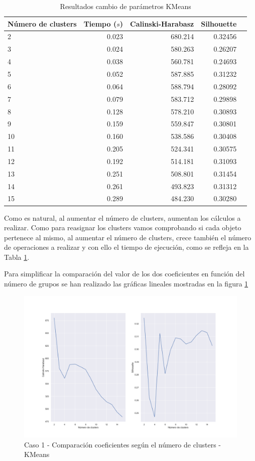 \documentclass[a4paper, 20pt]{article}
\begin{document}
\begin{table}[H]
\centering
\caption{Resultados cambio de parámetros KMeans}
\label{tab:param_kmeans1}
\begin{tabular}{lrrrr}
\toprule
Número de clusters & Tiempo ($s$) & Calinski-Harabasz & Silhouette &\\
\midrule
2 & 0.023 & 680.214 & 0.32456 \\
3 & 0.024 & 580.263 & 0.26207 \\
4 & 0.038 & 560.781 & 0.24693 \\
5 & 0.052 & 587.885 & 0.31232 \\
6 & 0.064 & 588.794 & 0.28092 \\
7 & 0.079 & 583.712 & 0.29898 \\
8 & 0.128 & 578.210 & 0.30893 \\
9 & 0.159 & 559.847 & 0.30801 \\
10 & 0.160 & 538.586 & 0.30408 \\
11 & 0.205 & 524.341 & 0.30575 \\
12 & 0.192 & 514.181 & 0.31093 \\
13 & 0.251 & 508.801 & 0.31454 \\
14 & 0.261 & 493.823 & 0.31312 \\
15 & 0.289 & 484.230 & 0.30280 \\
\bottomrule
\end{tabular}
\end{table}

Como es natural, al aumentar el número de clusters, aumentan los cálculos a realizar. Como para reasignar los clusters vamos comprobando si cada objeto pertenece al mismo, al aumentar el número de clusters, crece también el número de operaciones a realizar y con ello el tiempo de ejecución, como se refleja en la Tabla \ref{tab:param_kmeans1}.

Para simplificar la comparación del valor de los dos coeficientes en función del número de grupos se han realizado las gráficas lineales mostradas en la figura \ref{fig:param_kmeans1}

\begin{figure}[H]
    \centering
    \includegraphics[width=1.2\textwidth, height=0.45\textheight]{./caso1/param_kmeans}
    \caption{Caso 1 - Comparación coeficientes según el número de clusters - KMeans}
    \label{fig:param_kmeans1}
\end{figure}
\end{document}
